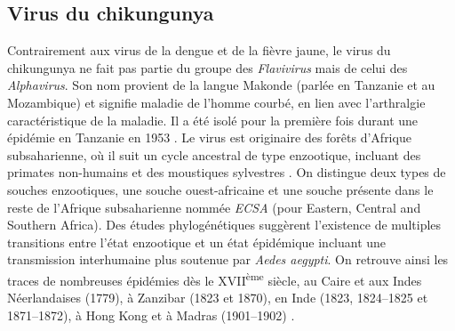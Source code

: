 \subsection{Virus du chikungunya}

Contrairement aux virus de la dengue et de la fièvre jaune, le virus du chikungunya ne fait pas partie du groupe des {\em Flavivirus} mais de celui des {\em Alphavirus}.
Son nom provient de la langue Makonde (parlée en Tanzanie et au Mozambique) et signifie \guillemotleft maladie de l'homme courbé\guillemotright, en lien avec l'arthralgie caractéristique de la maladie.
Il a été isolé pour la première fois durant une épidémie en Tanzanie en 1953 \cite{ross1956newala}.
Le virus est originaire des forêts d'Afrique subsaharienne, où il suit un cycle ancestral de type enzootique, incluant des primates non-humains et des moustiques sylvestres \cite{weaver2015chikungunya}.
On distingue deux types de souches enzootiques, une souche ouest-africaine et une souche présente dans le reste de l'Afrique subsaharienne nommée {\em ECSA}  (pour \guillemotleft Eastern, Central and Southern Africa\guillemotright).
Des études phylogénétiques suggèrent l'existence de multiples transitions entre l'état enzootique et un état épidémique incluant une transmission interhumaine plus soutenue par {\em Aedes aegypti}.
On retrouve ainsi les traces de nombreuses épidémies dès le XVII\textsuperscript{ème} siècle, au Caire et aux Indes Néerlandaises (1779), à Zanzibar (1823 et 1870), en Inde (1823, 1824–1825 et 1871–1872), à Hong Kong et à Madras (1901–1902) \cite{carey1971chikungunya}.

